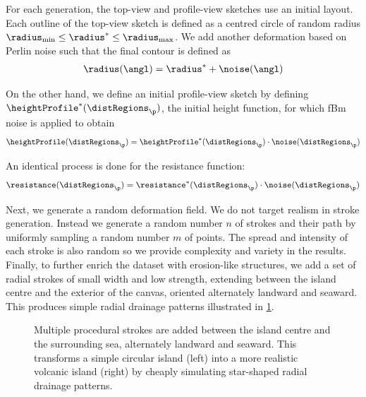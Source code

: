 For each generation, the top-view and profile-view sketches use an initial layout. Each outline of the top-view sketch is defined as a centred circle of random radius $\radius_\text{min} \leq \radius^* \leq \radius_\text{max}$. We add another deformation based on Perlin noise such that the final contour is defined as
\begin{align}
    \radius(\angl) = \radius^* + \noise(\angl)
\end{align}

On the other hand, we define an initial profile-view sketch by defining $\heightProfile^*(\distRegions_\p)$, the initial height function, for which fBm noise is applied to obtain
\begin{align}
    \heightProfile(\distRegions_\p) = \heightProfile^*(\distRegions_\p) \cdot \noise(\distRegions_\p)
\end{align}

An identical process is done for the resistance function:
\begin{align}
    \resistance(\distRegions_\p) = \resistance^*(\distRegions_\p) \cdot \noise(\distRegions_\p)
\end{align}

Next, we generate a random deformation field. We do not target realism in stroke generation. Instead we generate a random number $n$ of strokes and their path by uniformly sampling a random number $m$ of points. The spread and intensity of each stroke is also random so we provide complexity and variety in the results.
Finally, to further enrich the dataset with erosion-like structures, we add a set of radial strokes of small width and low strength, extending between the island centre and the exterior of the canvas, oriented alternately landward and seaward. This produces simple radial drainage patterns illustrated in \cref{fig:coral-island-radial-pattern-example}.

\begin{figure}
    \caption{Multiple procedural strokes are added between the island centre and the surrounding sea, alternately landward and seaward. This transforms a simple circular island (left) into a more realistic volcanic island (right) by cheaply simulating star-shaped radial drainage patterns.}
    \label{fig:coral-island-radial-pattern-example}
\end{figure}

